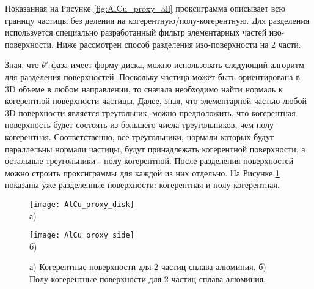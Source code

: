 \FloatBarrier

Показанная на Рисунке \cref{fig:AlCu_proxy_all} проксиграмма описывает всю границу частицы без деления на когерентную/полу-когерентную. Для разделения используется специально разработанный фильтр элементарных частей изо-поверхности. Ниже рассмотрен способ разделения изо-поверхности на 2 части. 

Зная, что $\theta '$-фаза имеет форму диска, можно использовать следующий алгоритм для разделения поверхностей. Поскольку частица может быть ориентирована в 3D объеме в любом направлении, то сначала необходимо найти нормаль к когерентной поверхности частицы. Далее, зная, что элементарной частью любой 3D поверхности является треугольник, можно предположить, что когерентная поверхность будет состоять из большего числа треугольников, чем полу-когерентная. Соответственно, все треугольники, нормали которых будут параллельны нормали частицы, будут принадлежать когерентной поверхности, а остальные треугольники - полу-когерентной. После разделения поверхностей можно строить проксиграммы для каждой из них отдельно. На Рисунке \cref{fig:AlCu_proxy_disk_side} показаны уже разделенные поверхности: когерентная и полу-когерентная.


\begin{figure}[htb]
	\begin{minipage}[b][][b]{0.49\textwidth}\centering
		\texttt{[image: AlCu\_proxy\_disk]} \\ а)
	\end{minipage}
	\begin{minipage}[b][][b]{0.49\textwidth}\centering
		\texttt{[image: AlCu\_proxy\_side]} \\ б)
	\end{minipage}
	\caption{а) Когерентные поверхности для 2 частиц сплава алюминия. б) Полу-когерентные поверхности для 2 частиц сплава алюминия.}
	\label{fig:AlCu_proxy_disk_side}
\end{figure}

